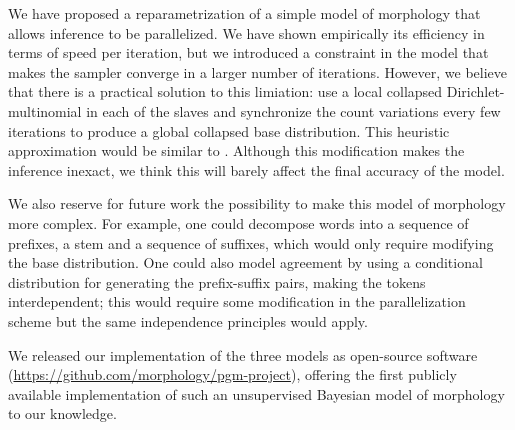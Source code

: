 We have proposed a reparametrization of a simple model of morphology that allows inference to be parallelized. We have shown empirically its efficiency in terms of speed per iteration, but we introduced a constraint in the model that makes the sampler converge in a larger number of iterations. However, we believe that there is a practical solution to this limiation: use a local collapsed Dirichlet-multinomial in each of the slaves and synchronize the count variations every few iterations to produce a global collapsed base distribution. This heuristic approximation would be similar to \cite{asuncion2008}. Although this modification makes the inference inexact, we think this will barely affect the final accuracy of the model.

We also reserve for future work the possibility to make this model of morphology more complex. For example, one could decompose words into a sequence of prefixes, a stem and a sequence of suffixes, which would only require modifying the base distribution. One could also model agreement by using a conditional distribution for generating the prefix-suffix pairs, making the tokens interdependent; this would require some modification in the parallelization scheme but the same independence principles would apply.

We released our implementation of the three models as open-source software (\url{https://github.com/morphology/pgm-project}), offering the first publicly available implementation of such an unsupervised Bayesian model of morphology to our knowledge.
